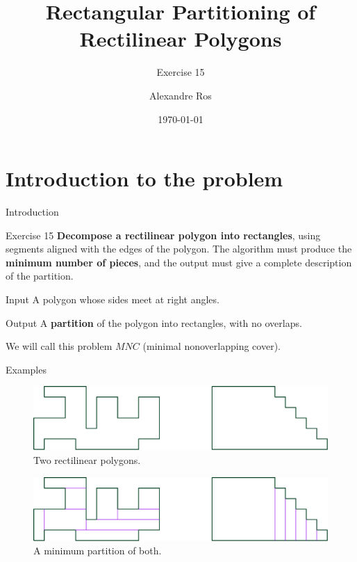 \documentclass{beamer}
\title{Rectangular Partitioning of Rectilinear Polygons}
\subtitle{Exercise 15}
\author{Alexandre Ros}
\date{\today}
\begin{document}
\frame{\titlepage}


\section{Introduction to the problem}

\begin{frame}{Introduction}
	\begin{block}{Exercise 15}
	\textbf{Decompose a rectilinear polygon into rectangles}, using segments aligned with the edges of the polygon.
The algorithm must produce the \textbf{minimum number of pieces}, and the output must give a
complete description of the partition.
	\end{block}
	\begin{block}{Input}
	A polygon whose sides meet at right angles.
	\end{block}  
	\begin{block}{Output}
	A \textbf{partition} of the polygon into rectangles, with no overlaps.
	\end{block}
	
	We will call this problem $MNC$ (minimal nonoverlapping cover).
\end{frame}

\begin{frame}{Examples}
\begin{figure}
\centering
  \includegraphics[width=.8\textwidth]{"./rect1.png"}
  \caption{Two rectilinear polygons.}
     \label{fig:question}
\end{figure}
\begin{figure}
\centering
  \includegraphics[width=.8\textwidth]{"./rec1sol.png"}
  \caption{A minimum partition of both.}
     \label{fig:question}
\end{figure}

\end{frame}
\end{document}
